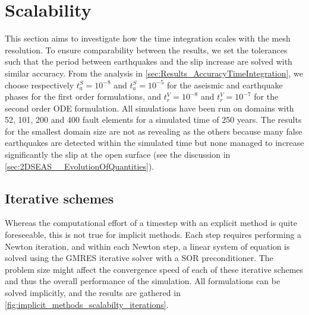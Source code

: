 \section{Scalability}
\label{sec:Results_Scalability}
This section aims to investigate how the time integration scales with the mesh resolution. To ensure comparability between the results, we set the tolerances such that the period between earthquakes and the slip increase are solved with similar accuracy. From the analysis in \autoref{sec:Results_AccuracyTimeIntegration}, we choose respectively $t_a^S=10^{-8}$ and $t_a^S=10^{-5}$ for the aseismic and earthquake phases for the first order formulations, and $t_r^V=10^{-8}$ and $t_r^V=10^{-7}$ for the second order ODE formulation. All simulations have been run on domains with 52, 101, 200 and 400 fault elements for a simulated time of 250 years. The results for the smallest domain size are not as revealing as the others because many false earthquakes are detected within the simulated time but none managed to increase significantly the slip at the open surface (see the discussion in \autoref{sec:2DSEAS__EvolutionOfQuantities}).

\subsection{Iterative schemes}
\label{ssec_Results_Scalability_IterativeSchemes}
Whereas the computational effort of a timestep with an explicit method is quite foreseeable, this is not true for implicit methods. Each step requires performing a Newton iteration, and within each Newton step, a linear system of equation is solved using the GMRES iterative solver with a SOR preconditioner. The problem size might affect the convergence speed of each of these iterative schemes and thus the overall performance of the simulation. All formulations can be solved implicitly, and the results are gathered in \autoref{fig:implicit_methods_scalabilty_iterations}. 

